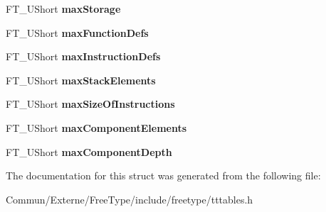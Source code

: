 \begin{DoxyCompactItemize}
\item 
F\+T\+\_\+\+U\+Short {\bfseries max\+Storage}\hypertarget{struct_t_t___max_profile___a502a8579e3d358f3c00776ed0cc8a168}{}\label{struct_t_t___max_profile___a502a8579e3d358f3c00776ed0cc8a168}

\item 
F\+T\+\_\+\+U\+Short {\bfseries max\+Function\+Defs}\hypertarget{struct_t_t___max_profile___acc24e822a62bbfaa86d36f691fcde60b}{}\label{struct_t_t___max_profile___acc24e822a62bbfaa86d36f691fcde60b}

\item 
F\+T\+\_\+\+U\+Short {\bfseries max\+Instruction\+Defs}\hypertarget{struct_t_t___max_profile___a3f7bd433baede417293415cf60f20d8f}{}\label{struct_t_t___max_profile___a3f7bd433baede417293415cf60f20d8f}

\item 
F\+T\+\_\+\+U\+Short {\bfseries max\+Stack\+Elements}\hypertarget{struct_t_t___max_profile___a2df9b9ff2a5a9daaa7c3d40fe024637f}{}\label{struct_t_t___max_profile___a2df9b9ff2a5a9daaa7c3d40fe024637f}

\item 
F\+T\+\_\+\+U\+Short {\bfseries max\+Size\+Of\+Instructions}\hypertarget{struct_t_t___max_profile___ac458411198b09d303ec8ae206e6926b6}{}\label{struct_t_t___max_profile___ac458411198b09d303ec8ae206e6926b6}

\item 
F\+T\+\_\+\+U\+Short {\bfseries max\+Component\+Elements}\hypertarget{struct_t_t___max_profile___a110e6d735610c6d8fd89221d03440c32}{}\label{struct_t_t___max_profile___a110e6d735610c6d8fd89221d03440c32}

\item 
F\+T\+\_\+\+U\+Short {\bfseries max\+Component\+Depth}\hypertarget{struct_t_t___max_profile___a9ae1f117c954e0711b03f1675d6191d9}{}\label{struct_t_t___max_profile___a9ae1f117c954e0711b03f1675d6191d9}

\end{DoxyCompactItemize}


The documentation for this struct was generated from the following file\+:\begin{DoxyCompactItemize}
\item 
Commun/\+Externe/\+Free\+Type/include/freetype/tttables.\+h\end{DoxyCompactItemize}
